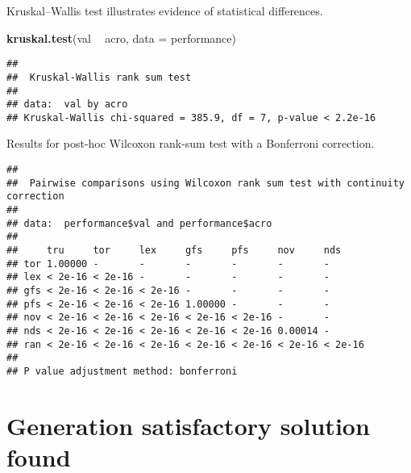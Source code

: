 \documentclass[]{book}
\newenvironment{Shaded}{\begin{snugshade}}{\end{snugshade}}
\newcommand{\DataTypeTok}[1]{\textcolor[rgb]{0.13,0.29,0.53}{#1}}
\newcommand{\KeywordTok}[1]{\textcolor[rgb]{0.13,0.29,0.53}{\textbf{#1}}}
\newcommand{\NormalTok}[1]{#1}
\newcommand{\OperatorTok}[1]{\textcolor[rgb]{0.81,0.36,0.00}{\textbf{#1}}}
\newcommand{\OtherTok}[1]{\textcolor[rgb]{0.56,0.35,0.01}{#1}}
\newcommand{\StringTok}[1]{\textcolor[rgb]{0.31,0.60,0.02}{#1}}
\begin{document}
Kruskal--Wallis test illustrates evidence of statistical differences.

\begin{Shaded}
\begin{Highlighting}[]
\KeywordTok{kruskal.test}\NormalTok{(val }\OperatorTok{~}\StringTok{ }\NormalTok{acro, }\DataTypeTok{data =}\NormalTok{ performance)}
\end{Highlighting}
\end{Shaded}

\begin{verbatim}
## 
##  Kruskal-Wallis rank sum test
## 
## data:  val by acro
## Kruskal-Wallis chi-squared = 385.9, df = 7, p-value < 2.2e-16
\end{verbatim}

Results for post-hoc Wilcoxon rank-sum test with a Bonferroni correction.

\begin{Shaded}
\end{Shaded}

\begin{verbatim}
## 
##  Pairwise comparisons using Wilcoxon rank sum test with continuity correction 
## 
## data:  performance$val and performance$acro 
## 
##     tru     tor     lex     gfs     pfs     nov     nds    
## tor 1.00000 -       -       -       -       -       -      
## lex < 2e-16 < 2e-16 -       -       -       -       -      
## gfs < 2e-16 < 2e-16 < 2e-16 -       -       -       -      
## pfs < 2e-16 < 2e-16 < 2e-16 1.00000 -       -       -      
## nov < 2e-16 < 2e-16 < 2e-16 < 2e-16 < 2e-16 -       -      
## nds < 2e-16 < 2e-16 < 2e-16 < 2e-16 < 2e-16 0.00014 -      
## ran < 2e-16 < 2e-16 < 2e-16 < 2e-16 < 2e-16 < 2e-16 < 2e-16
## 
## P value adjustment method: bonferroni
\end{verbatim}

\hypertarget{generation-satisfactory-solution-found}{%
\section{Generation satisfactory solution found}\label{generation-satisfactory-solution-found}}
\end{document}
